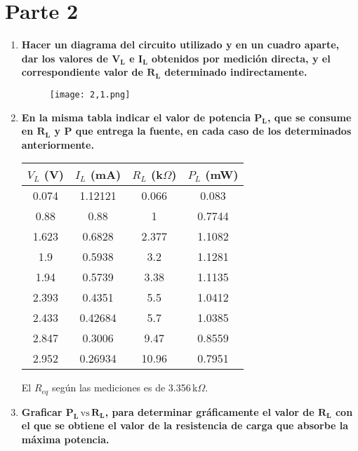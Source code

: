 \documentclass[a4paper,11pt]{report}
\begin{document}
\section{Parte 2}
\begin{enumerate}[label=\arabic*),font=\bfseries, style=nextline]
\item \textbf{Hacer un diagrama del circuito utilizado y en un cuadro aparte, dar los valores de $\bm{V_{L}}$ e $\bm{I_{L}}$ obtenidos por medición directa, y el correspondiente valor de $\bm{R_{L}}$ determinado indirectamente.}
\begin{figure}[H]
\begin{center}
\texttt{[image: 2,1.png]}
\end{center}
\end{figure}
\item \textbf{En la misma tabla indicar el valor de potencia $\bm{P_{L}}$, que se consume en $\bm{R_{L}}$ y $\bm{P}$ que entrega la fuente, en cada caso de los determinados anteriormente.}
\begin{center}
\begin{tabular}{|c|c|c|c|}
\hline 
$V_{L}$ (V) & $I_{L}$ (mA) & $R_{L}$ (k$\Omega$) & $P_{L}$ (mW) \\ 
\hline 
0.074 & 1.12121 & 0.066 & 0.083 \\ 
\hline 
0.88 & 0.88 & 1 & 0.7744 \\ 
\hline 
1.623 & 0.6828 & 2.377 & 1.1082 \\ 
\hline 
1.9 & 0.5938 & 3.2 & 1.1281 \\ 
\hline 
1.94 & 0.5739 & 3.38 & 1.1135 \\ 
\hline 
2.393 & 0.4351 & 5.5 & 1.0412 \\ 
\hline 
2.433 & 0.42684 & 5.7 & 1.0385 \\ 
\hline 
2.847 & 0.3006 & 9.47 & 0.8559 \\ 
\hline 
2.952 & 0.26934 & 10.96 & 0.7951 \\ 
\hline
\end{tabular}
\end{center}
El $R_{eq}$ según las mediciones es de 3.356\,k$\Omega$.
\item \textbf{Graficar $\bm{P_{L} \, \mathrm{vs} \, R_{L}}$, para determinar gráficamente el valor de $\bm{R_{L}}$ con el que se obtiene el valor de la resistencia de carga que absorbe la máxima potencia.}
%

\end{enumerate}
\end{document}
